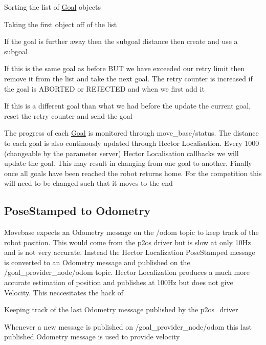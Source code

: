 \begin{DoxyItemize}
\item \-Sorting the list of \hyperlink{classGoal}{\-Goal} objects
\item \-Taking the first object off of the list
\item \-If the goal is further away then the subgoal distance then create and use a subgoal
\item \-If this is the same goal as before \-B\-U\-T we have exceeded our retry limit then remove it from the list and take the next goal. \-The retry counter is increased if the goal is \-A\-B\-O\-R\-T\-E\-D or \-R\-E\-J\-E\-C\-T\-E\-D and when we first add it
\item \-If this is a different goal than what we had before the update the current goal, reset the retry counter and send the goal
\end{DoxyItemize}

\-The progress of each \hyperlink{classGoal}{\-Goal} is monitored through move\-\_\-base/status. \-The distance to each goal is also continously updated through \-Hector \-Localisation. \-Every 1000 (changeable by the parameter server) \-Hector \-Localisation callbacks we will update the goal. \-This may result in changing from one goal to another. \-Finally once all goals have been reached the robot returns home. \-For the competition this will need to be changed such that it moves to the end\hypertarget{index_conversion}{}\subsection{\-Pose\-Stamped to Odometry}\label{index_conversion}
\-Movebase expects an \-Odometry message on the /odom topic to keep track of the robot position. \-This would come from the p2os driver but is slow at only 10\-Hz and is not very accurate. \-Instead the \-Hector \-Localization \-Pose\-Stamped message is converted to an \-Odometry message and published on the /goal\-\_\-provider\-\_\-node/odom topic. \-Hector \-Localization produces a much more accurate estimation of position and publishes at 100\-Hz but does not give \-Velocity. \-This neccesitates the hack of
\begin{DoxyItemize}
\item \-Keeping track of the last \-Odometry message published by the p2os\-\_\-driver
\item \-Whenever a new message is published on /goal\-\_\-provider\-\_\-node/odom this last published \-Odometry message is used to provide velocity
\end{DoxyItemize}

